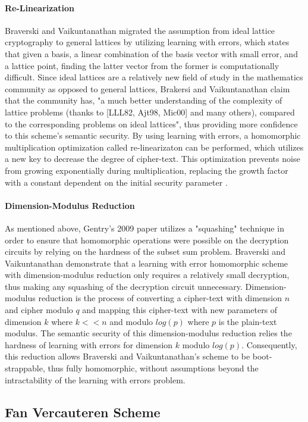 \documentclass[10pt, a4paper]{article}
\begin{document}
	\paragraph{Re-Linearization}
	Braverski and Vaikuntanathan migrated the assumption from ideal lattice cryptography to general lattices by utilizing learning with errors, which states that given a basis, a linear combination of the basis vector with small error, and a lattice point, finding the latter vector from the former is computationally difficult. Since ideal lattices are a relatively new field of study in the mathematics community as opposed to general lattices, Brakersi and Vaikuntanathan claim that the community has, "a much better understanding of the complexity of lattice problems (thanks to [LLL82, Ajt98, Mic00] and many others), compared to the corresponding problems on ideal lattices"\cite{brakerski2014efficient}, thus providing more confidence to this scheme's semantic security. By using learning with errors, a homomorphic multiplication optimization called re-linearizaton can be performed, which utilizes a new key to decrease the degree of cipher-text. This optimization prevents noise from growing exponentially during multiplication, replacing the growth factor with a constant dependent on the initial security parameter \lambda. 
	\paragraph{Dimension-Modulus Reduction}
	As mentioned above, Gentry's 2009 paper utilizes a "squashing" technique in order to ensure that homomorphic operations were possible on the decryption circuits by relying on the hardness of the subset sum problem. Braverski and Vaikuntanathan demonstrate that a learning with error homomorphic scheme with dimension-modulus reduction only requires a relatively small decryption, thus making any squashing of the decryption circuit unnecessary. Dimension-modulus reduction is the process of converting a cipher-text with dimension $n$ and cipher modulo $q$ and mapping this cipher-text with new parameters of dimension $k$ where $k << n$ and modulo $log(p)$ where $p$ is the plain-text modulus. The semantic security of this dimension-modulus reduction relies the hardness of learning with errors for dimension $k$ modulo $log(p)$. Consequently, this reduction allows Braverski and Vaikuntanathan's scheme to be boot-strappable, thus fully homomorphic, without assumptions beyond the intractability of the learning with errors problem.
	\subsection{Fan Vercauteren Scheme}
	
\end{document}
